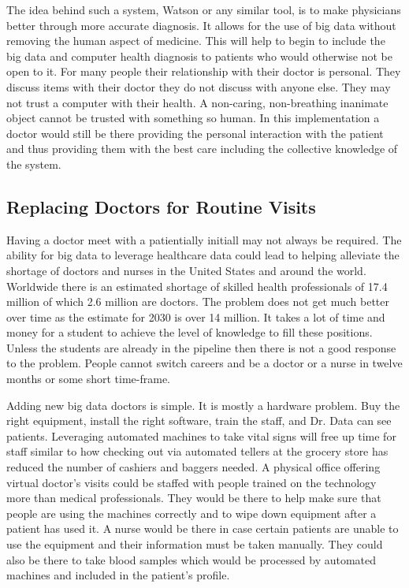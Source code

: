 \documentclass[sigconf]{acmart}
\begin{document}
The idea behind such a system, Watson or any similar tool, is to make 
physicians better through more accurate diagnosis.  It allows for the use 
of big data without removing the human aspect of medicine.  This will 
help to begin to include the big data and computer health diagnosis to 
patients who would otherwise not be open to it.  For many people their 
relationship with their doctor is personal.  They discuss items with their 
doctor they do not discuss with anyone else.  They may not trust a 
computer with their health\cite{ForbesTrust}.  A non-caring, non-breathing 
inanimate object cannot be trusted with something so human.  In this 
implementation a doctor would still be there providing the personal 
interaction with the patient and thus providing them with the best care 
including the collective knowledge of the system. 

\subsection{Replacing Doctors for Routine Visits}
Having a doctor meet with a patientially initiall may not always be 
required.  The ability for big data to leverage healthcare data could 
lead to helping alleviate the shortage of doctors and nurses in the 
United States and around the world.  Worldwide there is an estimated 
shortage of skilled health professionals of 17.4 million of which 2.6 
million are doctors.  The problem does not get much better over time as 
the estimate for 2030 is over 14 million\cite{WHOGHO}.  It takes a lot 
of time and money for a student to achieve the level of knowledge to 
fill these positions.  Unless the students are already in the pipeline 
then there is not a good response to the problem.  People cannot switch 
careers and be a doctor or a nurse in twelve months or some short time-frame.  

Adding new big data doctors is simple.  It is mostly a hardware problem.  
Buy the right equipment, install the right software, train the staff, and 
Dr. Data can see patients.  Leveraging automated machines to take vital 
signs will free up time for staff\cite{NextWeb} similar to how checking out 
via automated tellers at the grocery store has reduced the number of 
cashiers and baggers needed.  A physical office offering virtual doctor's 
visits could be staffed with people trained on the technology more than 
medical professionals.  They would be there to help make sure that people 
are using the machines correctly and to wipe down equipment after a patient 
has used it.  A nurse would be there in case certain patients are unable to 
use the equipment and their information must be taken manually.  They 
could also be there to take blood samples which would be processed by 
automated machines and included in the patient's profile.  
\end{document}
